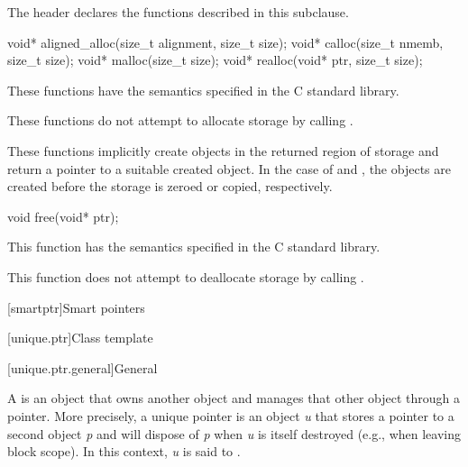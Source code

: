 \pnum
\begin{note}
The header 
declares the functions described in this subclause.
\end{note}

%
%
%
%
\begin{itemdecl}
void* aligned_alloc(size_t alignment, size_t size);
void* calloc(size_t nmemb, size_t size);
void* malloc(size_t size);
void* realloc(void* ptr, size_t size);
\end{itemdecl}

\begin{itemdescr}
\pnum
\effects
These functions have the semantics specified in the C standard library.

\pnum
\remarks
These functions do not attempt to allocate
storage by calling .
%

\pnum
These functions implicitly create objects
in the returned region of storage and
return a pointer to a suitable created object.
In the case of  and ,
the objects are created before the storage is zeroed or copied, respectively.
\end{itemdescr}

%
\begin{itemdecl}
void free(void* ptr);
\end{itemdecl}

\begin{itemdescr}
\pnum
\effects
This function has the semantics specified in the C standard library.

\pnum
\remarks
This function does not attempt to
deallocate storage by calling
.
\end{itemdescr}


[smartptr]{Smart pointers}

[unique.ptr]{Class template }

[unique.ptr.general]{General}

\pnum
A  is an object that owns another object and
manages that other object through a pointer. More precisely, a unique pointer
is an object \textit{u} that stores a pointer to a second object \textit{p} and
will dispose of \textit{p} when \textit{u} is itself destroyed (e.g., when
leaving block scope). In this context, \textit{u} is said
to  .

